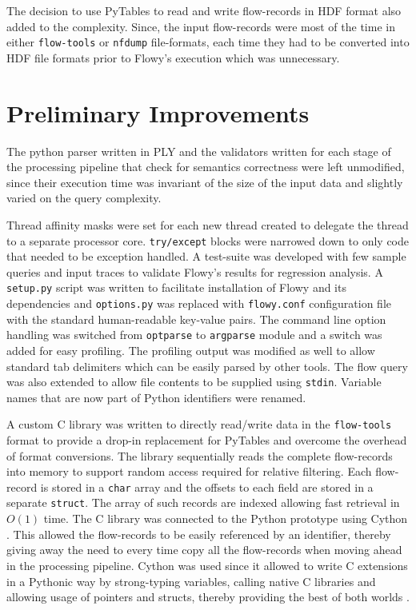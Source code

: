 The decision to use PyTables to read and write flow-records in
\ac{HDF} format also added to the complexity. Since, the input flow-records
were most of the time  in either
\texttt{flow-tools} or \texttt{nfdump} file-formats, each time they had to be
converted into \ac{HDF} file formats prior to Flowy's execution which was
unnecessary.


\section{Preliminary Improvements}\label{sec:prelim-improvements}

The python parser written in \ac{PLY} and the validators written for
each stage of the processing pipeline that check for semantics correctness
were left unmodified, since their execution time was invariant of the size of
the input data and slightly varied on the query complexity.

Thread affinity masks were set for each new thread created to delegate the
thread to a separate processor core. \texttt{try/except} blocks were narrowed
down to only code that needed to be exception handled. A test-suite was
developed with few sample queries and input traces to validate Flowy's results
for regression analysis. A \texttt{setup.py} script was written to facilitate
installation of 
Flowy and its dependencies and \texttt{options.py} was replaced with
\texttt{flowy.conf} configuration file with the standard human-readable
key-value pairs. The command line option handling was switched from
\texttt{optparse} to \texttt{argparse} module and a switch was added for easy
profiling. The profiling output was modified as well to allow standard tab
delimiters which can be easily parsed by other tools. The flow query was also
extended to allow file contents to be supplied using \texttt{stdin}. Variable
names that are now part of Python identifiers were renamed.

A custom C library was written to directly read/write data in the
\texttt{flow-tools} format to provide a drop-in replacement for PyTables and
overcome the overhead of format conversions. The library sequentially reads
the complete flow-records into memory to support random access required for
relative filtering. Each flow-record is stored in a \texttt{char} array and
the offsets to each field are stored in a separate \texttt{struct}.
 The array of such records are indexed allowing fast
retrieval in $O(1)$ time.  The C library was connected to the Python prototype
using Cython \cite{dseljebotn:2009}\cite{wilbers:2009}.  This allowed the
flow-records to be easily referenced by an identifier, thereby giving away the
need to every time copy all the flow-records when moving ahead in the
processing pipeline.  Cython was used since it allowed to write C extensions
in a Pythonic way by strong-typing variables, calling native C libraries and
allowing usage of pointers and structs, thereby providing the best of both
worlds \cite{sbehnel:2011}.


